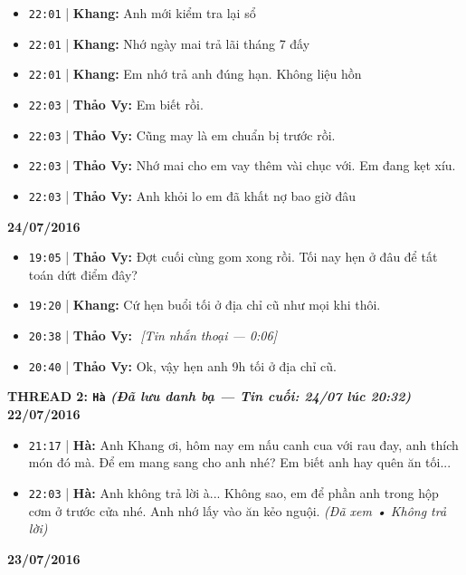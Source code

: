 \documentclass[12pt,a4paper]{article}
\begin{document}
\begin{itemize}[leftmargin=*, itemsep=2pt, topsep=2pt, parsep=0pt]
  \item \texttt{22:01} | \textbf{Khang:} Anh mới kiểm tra lại sổ
  \item \texttt{22:01} | \textbf{Khang:} Nhớ ngày mai trả lãi tháng 7 đấy
  \item \texttt{22:01} | \textbf{Khang:} Em nhớ trả anh đúng hạn. Không liệu hồn
  \item \texttt{22:03} | \textbf{Thảo Vy:} Em biết rồi.
  \item \texttt{22:03} | \textbf{Thảo Vy:} Cũng may là em chuẩn bị trước rồi.
  \item \texttt{22:03} | \textbf{Thảo Vy:} Nhớ mai cho em vay thêm vài chục với. Em đang kẹt xíu.
  \item \texttt{22:03} | \textbf{Thảo Vy:} Anh khỏi lo em đã khất nợ bao giờ đâu

\end{itemize}
\textbf{24/07/2016}

\begin{itemize}[leftmargin=*, itemsep=2pt, topsep=2pt, parsep=0pt]
  \item \texttt{19:05} | \textbf{Thảo Vy:} Đợt cuối cùng gom xong rồi. Tối nay hẹn ở đâu để tất toán dứt điểm đây?
  \item \texttt{19:20} | \textbf{Khang:} Cứ hẹn buổi tối ở địa chỉ cũ như mọi khi thôi.
  \item \texttt{20:38} | \textbf{Thảo Vy:} ️ \textit{[Tin nhắn thoại — 0:06]}
  \item \texttt{20:40} | \textbf{Thảo Vy:} Ok, vậy hẹn anh 9h tối ở địa chỉ cũ.


\end{itemize}

\vspace{0.3cm}\noindent\textbf{\large  THREAD 2: \texttt{Hà} \textit{(Đã lưu danh bạ — Tin cuối: 24/07 lúc 20:32)}}\\[0.15cm]


\textbf{22/07/2016}

\begin{itemize}[leftmargin=*, itemsep=2pt, topsep=2pt, parsep=0pt]
  \item \texttt{21:17} | \textbf{Hà:} Anh Khang ơi, hôm nay em nấu canh cua với rau đay, anh thích món đó mà. Để em mang sang cho anh nhé? Em biết anh hay quên ăn tối...
  \item \texttt{22:03} | \textbf{Hà:} Anh không trả lời à... Không sao, em để phần anh trong hộp cơm ở trước cửa nhé. Anh nhớ lấy vào ăn kẻo nguội. \textit{(Đã xem • Không trả lời)}

\end{itemize}
\textbf{23/07/2016}
\end{document}
